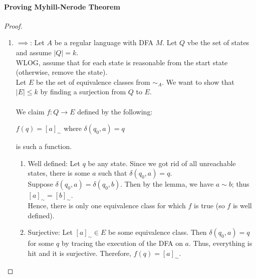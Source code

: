 \documentclass{article}
\begin{document}
    \paragraph{Proving Myhill-Nerode Theorem}
    \begin{proof}
    \begin{enumerate}
        \item $\implies$: Let $A$ be a regular language with DFA $M$. Let $Q$ vbe the set of states and assume $|Q| = k$.\\
        WLOG, assume that for each state is reasonable from the start state (otherwise, remove the state).\\
        Let $E$ be the set of equivalence classes from $\sim_A$. We want to show that $|E| \leq k$ by finding a surjection from $Q$ to $E$.\\
        \\
        We claim $f: Q \to E$ defined by the following:
        \begin{center}
            $f(q) = [a]_\sim$ where $\delta(q_0, a) = q$
        \end{center}
        is such a function.
        \begin{enumerate}
            \item Well defined: Let $q$ be any state. Since we got rid of all unreachable states, there is some $a$ such that $\delta(q_0, a) = q$.\\
            Suppose $\delta(q_0, a) = \delta(q_0, b)$. Then by the lemma, we have $a \sim b$; thus $[a]_\sim = [b]_\sim$.\\
            Hence, there is only one equivalence class for which $f$ is true (so $f$ is well defined).
            
            \item Surjective: Let $[a]_\sim \in E$ be some equivalence class. Then $\delta(q_0, a) = q$ for some $q$ by tracing the execution of the DFA on $a$. Thus, everything is hit and it is surjective. Therefore, $f(q) = [a]_\sim$.
        \end{enumerate}
        

\end{enumerate}
\end{proof}
\end{document}
